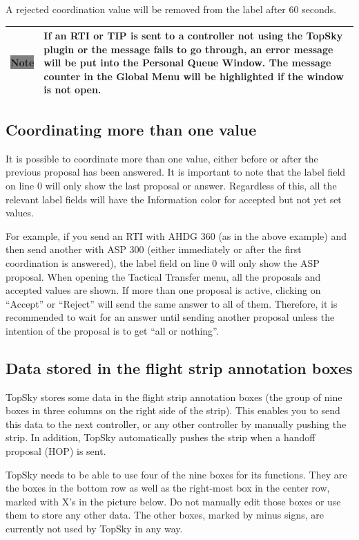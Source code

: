 \documentclass[a4paper,oneside,11pt]{memoir}
\newcommand{\colorref}[1]{\colorbox{Flight Highlight}{\color{#1}#1}}
\newcommand{\note}[1]{
  \begin{center}
    
    \begin{tabular}{| P{1.5cm}|p{10.5cm} |}
      \hline
      \cellcolor{shadecolor}\colorbox{gray}{\color{white}Note} &\cellcolor{shadecolor} #1 \\ \hline
    \end{tabular}
  \end{center}
}
\begin{document}
\bigskip

A rejected coordination value will be removed from the label after 60 seconds.

\note{If an RTI or TIP is sent to a controller not using the TopSky plugin or the message fails to go through, an error message will be put into the Personal Queue Window. The message counter in the Global Menu will be highlighted if the window is not open.}

\subsection{Coordinating more than one value}

It is possible to coordinate more than one value, either before or after the previous proposal has been answered. It is important to note that the label field on line 0 will only show the last proposal or answer. Regardless of this, all the relevant label fields will have the \colorref{Information} color for accepted but not yet set values.

\bigskip

For example, if you send an RTI with AHDG 360 (as in the above example) and then send another with ASP 300 (either immediately or after the first coordination is answered), the label field on line 0 will only show the ASP proposal. When opening the Tactical Transfer menu, all the proposals and accepted values are shown. If more than one proposal is active, clicking on “Accept” or “Reject” will send the same answer to all of them. Therefore, it is recommended to wait for an answer until sending another proposal unless the intention of the proposal is to get “all or nothing”.

\subsection{Data stored in the flight strip annotation boxes}

TopSky stores some data in the flight strip annotation boxes (the group of nine boxes in three columns on the right side of the strip). This enables you to send this data to the next controller, or any other controller by manually pushing the strip. In addition, TopSky automatically pushes the strip when a handoff proposal (HOP) is sent.

\bigskip

TopSky needs to be able to use four of the nine boxes for its functions. They are the boxes in the bottom row as well as the right-most box in the center row, marked with X’s in the picture below. Do not manually edit those boxes or use them to store any other data. The other boxes, marked by minus signs, are currently not used by TopSky in any way.
\end{document}
